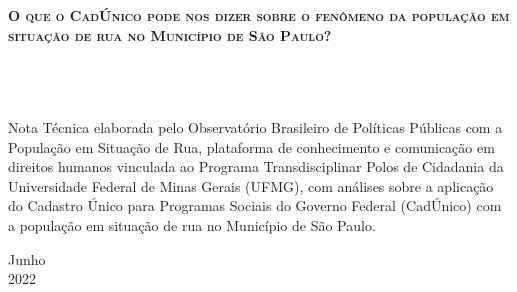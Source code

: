\documentclass[14pt]{extarticle}
\begin{document}
\begin{center}
\vspace{2cm}
{\Large\textsc\textbf{O que o CadÚnico pode nos dizer sobre o fenômeno da população em situação de rua no Município de São Paulo?}}\\
\vspace{0.5cm}
{\Large\textsc\textbf{}}\\
\vspace{0.1cm}
{\Large\textsc\textbf{}}\\
\vspace{0.1cm}
{\Large\textsc\textbf{}}\\
\end{center}
\hfill
\begin{minipage}{8cm}
\vspace{4cm}
Nota Técnica elaborada pelo Observatório Brasileiro de Políticas Públicas com a População em Situação de Rua, plataforma de conhecimento e comunicação em direitos humanos vinculada ao Programa Transdisciplinar Polos de Cidadania da Universidade Federal de Minas Gerais (UFMG), com análises sobre a aplicação do Cadastro Único para Programas Sociais do Governo Federal (CadÚnico) com a população em situação de rua no Município de São Paulo.
\end{minipage}

\begin{center}
\vspace{5cm}
{\normalsize{Junho}}\\
{\normalsize{2022}}\\
\end{center}
\newpage


\thispagestyle{empty}
\end{document}
